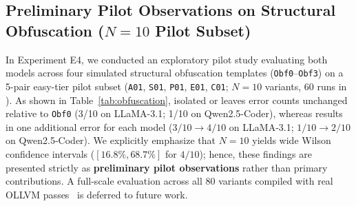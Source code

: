 \documentclass[conference]{IEEEtran}
\begin{document}
\subsection{Preliminary Pilot Observations on Structural Obfuscation ($N=10$ Pilot Subset)}
\label{sec:rq4}
In Experiment E4, we conducted an exploratory pilot study evaluating both models across four simulated structural obfuscation templates (\texttt{Obf0}--\texttt{Obf3}) on a 5-pair easy-tier pilot subset (\texttt{A01}, \texttt{S01}, \texttt{P01}, \texttt{E01}, \texttt{C01}; $N=10$ variants, 60 runs in ). As shown in Table~\ref{tab:obfuscation}, isolated  or  leaves error counts unchanged relative to \texttt{Obf0} (3/10 on LLaMA-3.1; 1/10 on Qwen2.5-Coder), whereas  results in one additional error for each model ($3/10 \rightarrow 4/10$ on LLaMA-3.1; $1/10 \rightarrow 2/10$ on Qwen2.5-Coder). We explicitly emphasize that $N=10$ yields wide Wilson confidence intervals ($[16.8\%, 68.7\%]$ for $4/10$); hence, these findings are presented strictly as \textbf{preliminary pilot observations} rather than primary contributions. A full-scale evaluation across all 80 variants compiled with real OLLVM passes~\cite{junod2015ollvm} is deferred to future work.

\begin{table}[t]
\centering
\caption{Experiment E4 (RQ4): Preliminary evaluation of simulated obfuscation templates (\texttt{Obf0}--\texttt{Obf3}) on the 5-pair easy-tier pilot subset ($N=10$ variants; 20 CT1 baseline runs + 60 obfuscated \texttt{Obf1}--\texttt{Obf3} runs = 540 total Layer 1 runs in \texttt{benchmark\_raw\_logs.json}).}
\label{tab:obfuscation}
\end{table}
\end{document}

